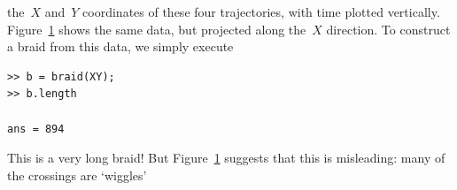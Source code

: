 \documentclass[12pt]{article}
\begin{document}
\begin{figure}
\begin{center}
{  \label{fig:testdata_trajs}
}\hspace{2em}
\end{center}
\caption{}
\end{figure}
%
the~$X$ and~$Y$ coordinates of these four trajectories, with time
plotted vertically.  Figure~\ref{fig:testdata_trajs} shows the same
data, but projected along the~$X$ direction.  To construct a braid
from this data, we simply execute
\begin{lstlisting}[frame=single,framerule=0pt]
>> b = braid(XY);
>> b.length

ans = 894
\end{lstlisting}
This is a very long braid!  But Figure~\ref{fig:testdata_trajs}
suggests that this is misleading: many of the crossings are `wiggles'
\end{document}
